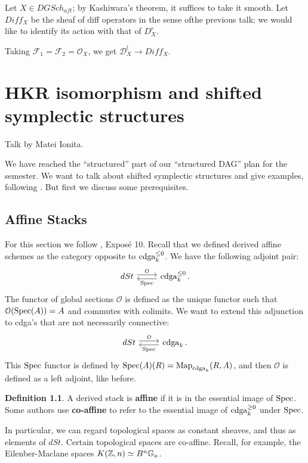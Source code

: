 \documentclass[10pt,a4paper,reqno,oneside]{book} %
\theoremstyle{plain}
\theoremstyle{definition}
\newtheorem{defin}[thm]{Definition}
\theoremstyle{remark}
\numberwithin{equation}{section}
\begin{document}
Let $X \in DGSch_{aft}$; by Kashiwara's theorem, it suffices to take it smooth. Let $Diff_X$ be the sheaf of diff operators
in the sense ofthe previous talk; we would like to identify its action with that of $D_X^r$.


Taking $\mathcal{F}_1 = \mathcal{F}_2 = \mathcal{O}_X$, we get $\mathcal{D}_X^l \to Diff_X$.




\chapter{HKR isomorphism and shifted symplectic structures}
Talk by Matei Ionita.

We have reached the ``structured'' part of our ``structured DAG'' plan for the semester. We want to talk about shifted
symplectic structures and give examples, following \cite{PTVV}. But first we discuss some prerequisites.

\section{Affine Stacks}
For this section we follow \cite{vezzosi2013autour}, Expos\'e 10. Recall that we defined derived affine schemes as
the category opposite to $\operatorname{cdga}_k^{\leq 0}$. We have the following adjoint pair:
\[
\begin{tikzcd}
dSt \arrow[shift left]{r}{\mathcal{O}} & \cdga_k^{\leq 0} \arrow[shift left]{l}{\Spec} .
\end{tikzcd}
\]
The functor of global sections $\mathcal{O}$ is defined as the unique functor such that $\mathcal{O}(\operatorname{Spec}(A)) = A$ and
commutes with colimits. We want to extend this adjunction to cdga's that are not necessarily connective:
\[
\begin{tikzcd}
dSt \arrow[shift left]{r}{\mathcal{O}} & \cdga_k \arrow[shift left]{l}{\Spec} .
\end{tikzcd}
\]
This $\operatorname{Spec}$ functor is defined by $\operatorname{Spec}(A)(R) = \operatorname{Map}_{\operatorname{cdga}_k}(R,A)$, and then $\mathcal{O}$ is defined as a left adjoint,
like before.

\begin{defin}
A derived stack is \textbf{affine} if it is in the essential image of $\operatorname{Spec}$. Some authors use \textbf{co-affine}
to refer to the essential image of $\operatorname{cdga}_k^{\geq 0}$ under $\operatorname{Spec}$.
\end{defin}

In particular, we can regard topological spaces as constant sheaves, and thus as elements of $dSt$. Certain topological
spaces are co-affine. Recall, for example, the Eilenber-Maclane spaces $K(\mathbb Z,n) \simeq B^n\mathbb G_a$.
\end{document}
